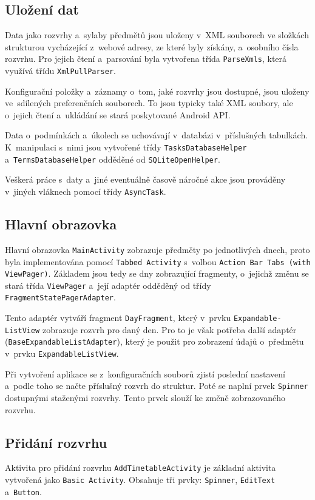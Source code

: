 \documentclass[12pt, a4paper]{article}
\begin{document}
		\subsection{Uložení dat}
		Data jako rozvrhy a~sylaby předmětů jsou uloženy v~XML souborech ve složkách strukturou vycházející z~webové adresy, ze které byly získány, a~osobního čísla rozvrhu. Pro jejich čtení a~parsování byla vytvořena třída \texttt{ParseXmls}, která využívá třídu \texttt{XmlPullParser}.
		
		Konfigurační položky a~záznamy o~tom, jaké rozvrhy jsou dostupné, jsou uloženy ve~sdílených preferenčních souborech. To jsou typicky také XML soubory, ale o~jejich čtení a~ukládání se stará poskytované Android API.
		
		Data o~podmínkách a~úkolech se uchovávají v~databázi v~příslušných tabulkách. K~manipulaci s~nimi jsou vytvořené třídy \texttt{TasksDatabaseHelper} a~\texttt{TermsDatabaseHelper} odděděné od \texttt{SQLiteOpenHelper}.
		
		Veškerá práce s~daty a~jiné eventuálně časově náročné akce jsou prováděny v~jiných vláknech pomocí třídy \texttt{AsyncTask}.
		
		\subsection{Hlavní obrazovka}
		Hlavní obrazovka \texttt{MainActivity} zobrazuje předměty po jednotlivých dnech, proto byla implementována pomocí \texttt{Tabbed Activity} s~volbou \texttt{Action Bar Tabs (with ViewPager)}. Základem jsou tedy  se dny zobrazující fragmenty, o~jejichž změnu se stará třída \texttt{ViewPager} a~její adaptér odděděný od třídy \texttt{FragmentStatePagerAdapter}.
		
		Tento adaptér vytváří fragment \texttt{DayFragment}, který v~prvku \texttt{Expandable-\\ListView} zobrazuje rozvrh pro daný den. Pro to je však potřeba další adaptér (\texttt{BaseExpandableListAdapter}), který je použit pro zobrazení údajů o~předmětu v~prvku \texttt{ExpandableListView}.
		
		Při vytvoření aplikace se z~konfiguračních souborů zjistí poslední nastavení a~podle toho se načte příslušný rozvrh do struktur. Poté se naplní prvek \texttt{Spinner} dostupnými staženými rozvrhy. Tento prvek slouží ke změně zobrazovaného rozvrhu.
		
		\subsection{Přidání rozvrhu}
		Aktivita pro přidání rozvrhu \texttt{AddTimetableActivity} je základní aktivita vytvořená jako \texttt{Basic Activity}. Obsahuje tři prvky: \texttt{Spinner}, \texttt{EditText} a~\texttt{Button}.
		
\end{document}
